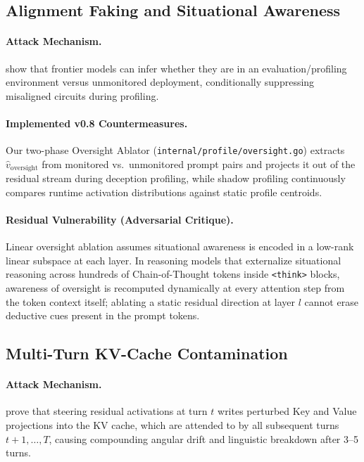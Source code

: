 \documentclass{article}
\begin{document}
\subsection{Alignment Faking and Situational Awareness}
\paragraph{Attack Mechanism.}
\cite{alignmentfaking2025} show that frontier models can infer whether they are in an evaluation/profiling environment versus unmonitored deployment, conditionally suppressing misaligned circuits during profiling.

\paragraph{Implemented v0.8 Countermeasures.}
Our two-phase Oversight Ablator (\texttt{internal/profile/oversight.go}) extracts $\hat{v}_{\text{oversight}}$ from monitored vs.\ unmonitored prompt pairs and projects it out of the residual stream during deception profiling, while shadow profiling continuously compares runtime activation distributions against static profile centroids.

\paragraph{Residual Vulnerability (Adversarial Critique).}
Linear oversight ablation assumes situational awareness is encoded in a low-rank linear subspace at each layer. In reasoning models that externalize situational reasoning across hundreds of Chain-of-Thought tokens inside \texttt{<think>} blocks, awareness of oversight is recomputed dynamically at every attention step from the token context itself; ablating a static residual direction at layer $l$ cannot erase deductive cues present in the prompt tokens.

\subsection{Multi-Turn KV-Cache Contamination}
\paragraph{Attack Mechanism.}
\cite{promptactivationduality2026} prove that steering residual activations at turn $t$ writes perturbed Key and Value projections into the KV cache, which are attended to by all subsequent turns $t+1, \ldots, T$, causing compounding angular drift and linguistic breakdown after 3--5 turns.
\end{document}
